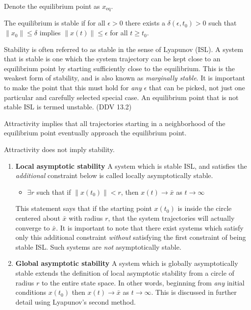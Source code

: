 Denote the equilibrium point as $x_{\text{eq}}$.

\begin{defn-dan}[Stability]
The equilibrium is stable if for all $\epsilon>0$ there exists a $\delta(\epsilon,t_{0})>0$ such that $\|x_{0}\|\leq\delta$ implies $\|x(t)\|\leq\epsilon$ for all $t\geq t_{0}$.
\end{defn-dan}

Stability is often referred to as stable in the sense of Lyapunov (ISL).
A system that is stable is one which the system trajectory can be kept close to an equilibrium point by starting sufficiently close to the equilibrium.
This is the weakest form of stability, and is also known as \textit{marginally stable}.
It is important to make the point that this must hold for \textit{any} $\epsilon$ that can be picked, not just one particular and carefully selected special case.
An equilibrium point that is not stable ISL is termed unstable.
(DDV 13.2)

\begin{defn-dan}[Attractive]
\end{defn-dan}

Attractivity implies that all trajectories starting in a neighborhood of the equilibrium point eventually approach the equilibrium point.

\begin{rem-dan}
  Attractivity does not imply stability.
\end{rem-dan}

\begin{enumerate}
  \item{\textbf{Local asymptotic stability} A system which is stable ISL, and satisfies the \textit{additional} constraint below is called locally asymptotically stable.
  \begin{itemize}
    \item{$\exists r$ such that if $\|x(t_{0})\|<r$, then $x(t)\rightarrow\bar{x}$ as $t\rightarrow\infty$}
  \end{itemize}
  This statement says that if the starting point $x(t_{0})$ is inside the circle centered about $\bar{x}$ with radius $r$, that the system trajectories will actually converge to $\bar{x}$.
  It is important to note that there exist systems which satisfy only this additional constraint \textit{without} satisfying the first constraint of being stable ISL.\@
  Such systems are \textit{not} asymptotically stable.}

  \item{\textbf{Global asymptotic stability} A system which is globally asymptotically stable extends the definition of local asymptotic stability from a circle of radius $r$ to the entire state space.
  In other words, beginning from \textit{any} initial conditions $x(t_{0})$ then $x(t)\rightarrow\bar{x}$ as $t\rightarrow\infty$.
  This is discussed in further detail using Lyapunov's second method.}
\end{enumerate}

